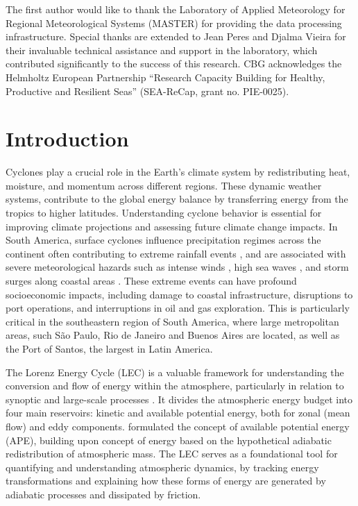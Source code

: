 \documentclass[pdflatex,sn-chicago]{sn-jnl}%
\theoremstyle{plain}
\theoremstyle{definition}
\theoremstyle{remark}
\theoremstyle{definition}
\begin{document}
The first author would like to thank the Laboratory of Applied Meteorology for Regional Meteorological Systems (MASTER) for providing the data processing infrastructure. Special thanks are extended to Jean Peres and Djalma Vieira for their invaluable technical assistance and support in the laboratory, which contributed significantly to the success of this research. CBG acknowledges the Helmholtz European Partnership “Research Capacity Building for Healthy, Productive and Resilient Seas” (SEA-ReCap, grant no. PIE-0025).

\section{Introduction}\label{sec1}

Cyclones play a crucial role in the Earth's climate system by redistributing heat, moisture, and momentum across different regions. These dynamic weather systems, contribute to the global energy balance by transferring energy from the tropics to higher latitudes. Understanding cyclone behavior is essential for improving climate projections and assessing future climate change impacts. In South America, surface cyclones influence precipitation regimes across the continent \citep{reboita2010precipitation, reboita2018extratropical, de2022hybrid} often contributing to extreme rainfall events \citep[e.g.,][]{de2021ocean,de2024extreme}, and are associated with severe meteorological hazards such as intense winds \citep{cardoso2022synoptic,de2021ocean}, high sea waves \citep{da2025classification,gramcianinov2023impact}, and storm surges along coastal areas \citep{leal2023identification,tecchiomean}. These extreme events can have profound socioeconomic impacts, including damage to coastal infrastructure, disruptions to port operations, and interruptions in oil and gas exploration. This is particularly critical in the southeastern region of South America, where large metropolitan areas, such São Paulo, Rio de Janeiro and Buenos Aires are located, as well as the Port of Santos, the largest in Latin America. 

The Lorenz Energy Cycle (LEC) is a valuable framework for understanding the conversion and flow of energy within the atmosphere, particularly in relation to synoptic and large-scale processes \citep{lorenz1967nature}. It divides the atmospheric energy budget into four main reservoirs: kinetic and available potential energy, both for zonal (mean flow) and eddy components. \citet{lorenz1955available} formulated the concept of available potential energy (APE), building upon \citet{margules1903energie} concept of energy based on the hypothetical adiabatic redistribution of atmospheric mass. The LEC serves as a foundational tool for quantifying and understanding atmospheric dynamics, by tracking energy transformations and explaining how these forms of energy are generated by adiabatic processes and dissipated by friction.
\end{document}

